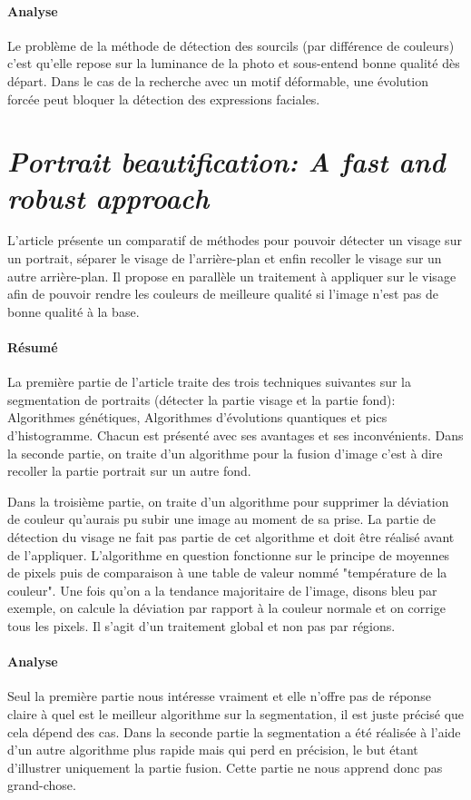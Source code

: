 \documentclass[11pt, french]{report-rd-info}
\begin{document}
\paragraph{Analyse}
Le problème de la méthode de détection des sourcils (par différence de couleurs) c’est qu’elle repose sur la luminance de la photo et sous-entend bonne qualité dès départ.
Dans le cas de la recherche avec un motif déformable, une évolution forcée peut bloquer la détection des expressions faciales.


\section{\emph{Portrait beautification: A fast and robust approach}}
L'article \cite{Liu2007} présente un comparatif de méthodes pour pouvoir détecter un visage sur un portrait, séparer le visage de l'arrière-plan et enfin recoller le visage sur un autre arrière-plan. Il propose en parallèle un traitement à appliquer sur le visage afin de pouvoir rendre les couleurs de meilleure qualité si l'image n'est pas de bonne qualité à la base.

\paragraph{Résumé}
La première partie de l'article traite des trois techniques suivantes sur la segmentation de portraits (détecter la partie visage et la partie fond): Algorithmes génétiques, Algorithmes d'évolutions quantiques et pics d'histogramme. Chacun est présenté avec ses avantages et ses inconvénients.
Dans la seconde partie, on traite d'un algorithme pour la fusion d'image c'est à dire recoller la partie portrait sur un autre fond.

Dans la troisième partie, on traite d'un algorithme pour supprimer la déviation de couleur qu'aurais pu subir une image au moment de sa prise. La partie de détection du visage ne fait pas partie de cet algorithme et doit être réalisé avant de l'appliquer. L'algorithme en question fonctionne sur le principe de moyennes de pixels puis de comparaison à une table de valeur nommé "température de la couleur". Une fois qu'on a la tendance majoritaire de l'image, disons bleu par exemple, on calcule la déviation par rapport à la couleur normale et on corrige tous les pixels. Il s'agit d'un traitement global et non pas par régions.

\paragraph{Analyse}
Seul la première partie nous intéresse vraiment et elle n'offre pas de réponse claire à quel est le meilleur algorithme sur la segmentation, il est juste précisé que cela dépend des cas.
Dans la seconde partie la segmentation a été réalisée à l'aide d'un autre algorithme plus rapide mais qui perd en précision, le but étant d'illustrer uniquement la partie fusion. Cette partie ne nous apprend donc pas grand-chose.
\end{document}
